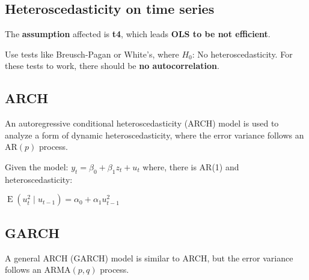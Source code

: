 \documentclass[10pt, a4paper, landscape]{article}
\DeclareMathOperator{\E}{E}
\begin{document}
\begin{multicols}{3}
\section*{Heteroscedasticity on time series}

The \textbf{assumption} affected is \textbf{t4}, which leads \textbf{OLS to be not efficient}.

Use tests like Breusch-Pagan or White's, where \( H_{0} \): No heteroscedasticity. For these tests to work, there should be \textbf{no autocorrelation}.

\subsection*{ARCH}

An autoregressive conditional heteroscedasticity (ARCH) model is used to analyze a form of dynamic heteroscedasticity, where the error variance follows an \( \text{AR}(p) \) process.

Given the model: \( y_{t} = \beta_{0} + \beta_{1} z_{t} + u_{t} \) where, there is AR(1) and heteroscedasticity:

\begin{center}
	\( \E(u_{t}^{2} \mid u_{t - 1}) = \alpha_{0} + \alpha_{1} u_{t - 1}^{2} \)
\end{center}

\subsection*{GARCH}

A general ARCH (GARCH) model is similar to ARCH, but the error variance follows an \( \text{ARMA}(p, q) \) process.

\end{multicols}
\end{document}
